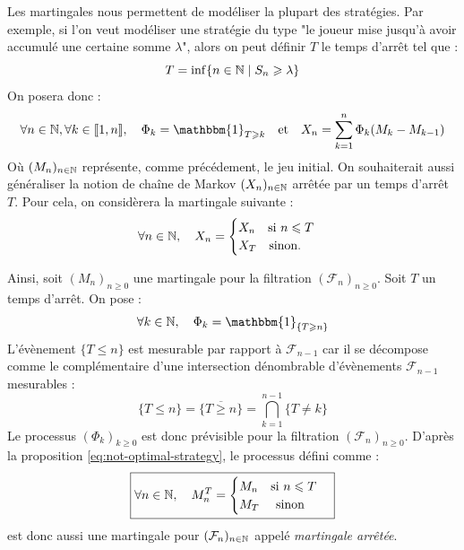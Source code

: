 \begin{remark}
    Les martingales nous permettent de modéliser la plupart des stratégies. Par exemple, si l'on veut 
    modéliser une stratégie du type "le joueur mise jusqu'à avoir accumulé une certaine somme $ \lambda$", 
    alors on peut définir $T$ le temps d'arrêt tel que : 
        $$ T = \inf \{n \in \mathbb{N} \mid S_n \geqslant \lambda\} $$ 
    On posera donc : 
        $$ \forall n \in \N, \forall k \in \llbracket 1, n \rrbracket, \quad \Phi_k = \mathbbm{1}_{T \geqslant k} \quad \text{et} 
        \quad X_n = \sum_{k=1}^{n} \Phi_k (M_k - M_{k-1}) $$  
    Où $(M_n)_{n \in \mathbb{N}}$ représente, comme précédement, le jeu initial.
    On souhaiterait aussi généraliser la notion de chaîne de Markov $(X_n)_{n \in \mathbb{N}}$ arrêtée par un temps d'arrêt $T$. Pour cela, 
    on considèrera la martingale suivante :
        $$ 
            \forall n \in \mathbb{N}, \quad X_n = 
                \begin{cases}
                    X_n \quad \text{si } n \leqslant T \\ 
                    X_T \quad \text{sinon.}  
                \end{cases}
        $$
\end{remark}

\begin{definition}
    Ainsi, soit $(M_n)_{n \geqslant 0}$ une martingale pour la filtration $ (\mathcal{F}_n)_{n \geqslant 0}$.
    Soit $T$ un temps d'arrêt. On pose : 
        $$ \forall k \in \N, \quad \Phi_k = \mathbbm{1}_{\{T \geqslant n\}} $$ 
    L'évènement $\{T \leqslant n\}$ est mesurable par rapport à $ \mathcal{F}_{n-1}$ car il se décompose 
    comme le complémentaire d'une intersection dénombrable d'évènements $ \mathcal{F}_{n-1}$ mesurables : 
        $$ \{T \leqslant n\} = \overline{\{T \geqslant n\}} = \bigcap_{k = 1}^{n-1} \{T \not = k\} $$ 
    Le processus $ (\Phi_k)_{k \geqslant 0} $ est donc prévisible pour la filtration $( \mathcal{F}_n)_{n \geqslant 0}$. 
    D'après la proposition \ref{eq:not-optimal-strategy}, le processus défini comme : 
        \begin{equation}\label{eq:martingale-arrete}
            \boxed{
                \forall n \in \mathbb{N}, \quad M_n^T = 
            \begin{cases}
                M_n \quad \text{si } n \leqslant T \\ 
                M_T \quad \text{ sinon }  
            \end{cases}
            }
        \end{equation}
    est donc aussi une martingale pour $ (\mathcal{F}_{n})_{n \in \mathbb{N}}$ appelé \emph{martingale arrêtée}.
\end{definition}

